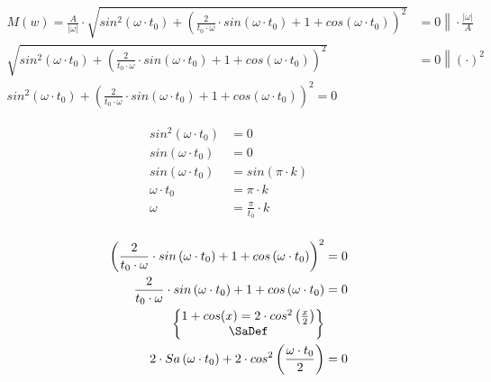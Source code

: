 \begin{task}

\begin{align*}
M\left(w\right) = \frac{A}{\left|\omega\right|} \cdot \sqrt{sin^2\left(\omega \cdot t_0\right) + \left( \frac{2}{t_0 \cdot \omega} \cdot  sin\left(\omega \cdot t_0\right) + 1 + cos\left(\omega \cdot t_0\right)\right)^2 } &= 0  \left.  \right \| \cdot \frac{\left|\omega\right|}{A}\\
\sqrt{sin^2\left(\omega \cdot t_0\right) + \left( \frac{2}{t_0 \cdot \omega} \cdot  sin\left(\omega \cdot t_0\right) + 1 + cos\left(\omega \cdot t_0\right)\right)^2 } &= 0 \left.  \right \| (\cdot)^2\\
sin^2\left(\omega \cdot t_0\right) + \left( \frac{2}{t_0 \cdot \omega} \cdot  sin\left(\omega \cdot t_0\right) + 1 + cos\left(\omega \cdot t_0\right)\right)^2 = 0
\end{align*}


\begin{align*}
sin^2\left(\omega \cdot t_0\right) &= 0 \\
sin\left(\omega \cdot t_0\right) &= 0 \\
sin\left(\omega \cdot t_0\right) &= sin\left(\pi \cdot k\right)\\ 
\omega \cdot t_0 &= \pi \cdot k\\
\omega &= \frac{\pi}{t_0} \cdot k\\
\end{align*}


\begin{align*}
\left( \frac{2}{t_0 \cdot \omega} \cdot  sin\left(\omega \cdot t_0\right) + 1 + cos\left(\omega \cdot t_0\right)\right)^2 &= 0\\
\frac{2}{t_0 \cdot \omega} \cdot  sin\left(\omega \cdot t_0\right) + 1 + cos\left(\omega \cdot t_0\right) &= 0\\
\begin{Bmatrix}
1+cos(x) = 2 \cdot cos^2\left(\frac{x}{2}\right)\\
\SaDef
\end{Bmatrix}\\
2 \cdot Sa\left(\omega \cdot t_0\right) + 2 \cdot cos^2\left(\frac{\omega \cdot t_0}{2}\right) &= 0\\
\end{align*}


\end{task}
